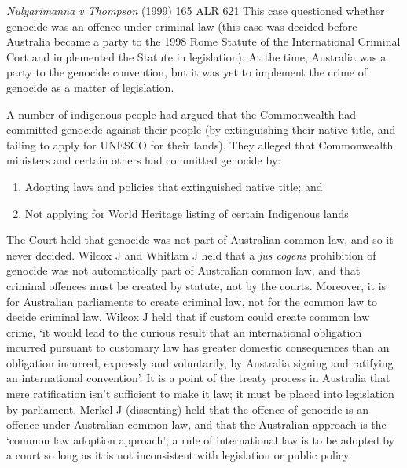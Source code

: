 \begin{casedetails}{\textit{Nulyarimanna v Thompson} (1999) 165 ALR 621}\label{case: Nulyarimanna v Thompson}
    \flushleft
    This case questioned whether genocide was an offence under criminal law (this case was decided before Australia became a party to the 1998 Rome Statute of the International Criminal Cort and implemented the Statute in legislation). At the time, Australia was a party to the genocide convention, but it was yet to implement the crime of genocide as a matter of legislation.

    \vspace{\baselineskip}

    A number of indigenous people had argued that the Commonwealth had committed genocide against their people (by extinguishing their native title, and failing to apply for UNESCO for their lands). They alleged that Commonwealth ministers and certain others had committed genocide by:
    \begin{enumerate}[label=(\alph*)]
        \item Adopting laws and policies that extinguished native title; and
        \item Not applying for World Heritage listing of certain Indigenous lands
    \end{enumerate}

    The Court held that genocide was not part of Australian common law, and so it never decided. Wilcox J and Whitlam J held that a \textit{jus cogens} prohibition of genocide was not automatically part of Australian common law, and that criminal offences must be created by statute, not by the courts. Moreover, it is for Australian parliaments to create criminal law, not for the common law to decide criminal law. Wilcox J held that if custom could create common law crime, `it would lead to the curious result that an international obligation incurred pursuant to customary law has greater domestic consequences than an obligation incurred, expressly and voluntarily, by Australia signing and ratifying an international convention'. It is a point of the treaty process in Australia that mere ratification isn't sufficient to make it law; it must be placed into legislation by parliament. Merkel J (dissenting) held that the offence of genocide is an offence under Australian common law, and that the Australian approach is the `common law adoption approach'; a rule of international law is to be adopted by a court so long as it is not inconsistent with legislation or public policy.
\end{casedetails}

